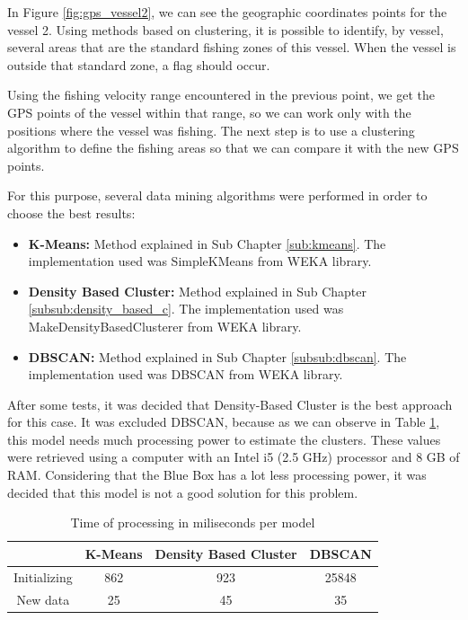 In Figure \ref{fig:gps_vessel2}, we can see the geographic coordinates points for the vessel 2. Using methods based on clustering, it is possible to identify, by vessel, several areas that are the standard fishing zones of this vessel. When the vessel is outside that standard zone, a flag should occur.

Using the fishing velocity range encountered in the previous point, we get the GPS points of the vessel within that range, so we can work only with the positions where the vessel was fishing. The next step is to use a clustering algorithm to define the fishing areas so that we can compare it with the new GPS points. 

For this purpose, several data mining algorithms were performed in order to choose the best results:

\begin{itemize}
\item \textbf{K-Means:} Method explained in Sub Chapter \ref{sub:kmeans}. The implementation used was SimpleKMeans from WEKA library.


\item \textbf{Density Based Cluster:} Method explained in Sub Chapter \ref{subsub:density_based_c}. The implementation used was MakeDensityBasedClusterer from WEKA library.
 

\item \textbf{DBSCAN:} Method explained in Sub Chapter \ref{subsub:dbscan}. The implementation used was DBSCAN from WEKA library.

\end{itemize}

After some tests, it was decided that Density-Based Cluster is the best approach for this case. It was excluded DBSCAN, because as we can observe in Table \ref{table:mill_per_moodle}, this model needs much processing power to estimate the clusters. These values were retrieved using a computer with an Intel i5 (2.5 GHz) processor and 8 GB of RAM. Considering that the Blue Box has a lot less processing power, it was decided that this model is not a good solution for this problem.
\\

\begin {table}[]
\caption {Time of processing in miliseconds per model}
\begin{center}
\begin{tabular}{c|c|c|c}
& \textbf{K-Means} & \textbf{Density Based Cluster} & \textbf{DBSCAN} \\
\hline
Initializing & 862 & 923 & 25848 \\

New data & 25 & 45 & 35 
\label{table:mill_per_moodle}
\end{tabular}
\end{center}
\end {table}

